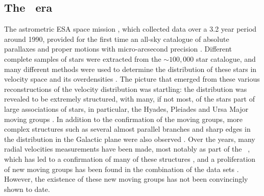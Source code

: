 

\subsection{The \Hipparcos\ era}

The astrometric ESA space mission \Hipparcos, which collected data
over a 3.2 year period around 1990, provided for the first time an
all-sky catalogue of absolute parallaxes and proper motions with
micro-arcsecond precision \citep{ESA97a}. Different complete samples
of stars were extracted from the $\sim\!100,000$ star catalogue, and
many different methods were used to determine the distribution of
these stars in velocity space and its overdensities
\citep{1997A&A...318...29C,1997ESASP.402..519F,1998AJ....115.2384D,1998A&A...340..384C,1999A&AS..135....5C,1999A&A...341..427A,1999A&A...341...86B,1999MNRAS.308..731S}. The
picture that emerged from these various reconstructions of the
velocity distribution was startling: the distribution was revealed to
be extremely structured, with many, if not most, of the stars part of
large associations of stars, in particular, the Hyades, Pleiades and
Ursa Major moving groups \citep{1998AJ....115.2384D}. In addition to
the confirmation of the moving groups, more complex structures such as
several almost parallel branches and sharp edges in the distribution
in the Galactic plane were also observed
\citep{1999MNRAS.308..731S}. Over the years, many radial velocities
measurements have been made, most notably as part of the \gcs\
\citep{2004A&A...418..989N}, which has led to a confirmation of many
of these structures \citep{2005A&A...430..165F}, and a proliferation
of new moving groups has been found in the combination of the data
sets \citep{2008A&A...490..135A,2009ApJ...692L.113Z}. However, the
existence of these new moving groups has not been convincingly shown
to date.


